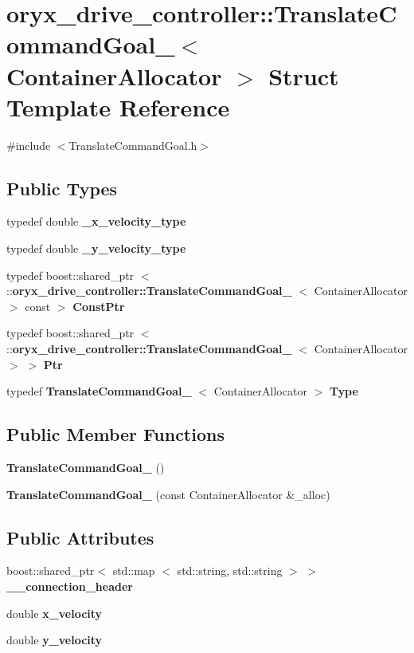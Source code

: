 \section{oryx\-\_\-drive\-\_\-controller\-:\-:\-Translate\-Command\-Goal\-\_\-$<$ \-Container\-Allocator $>$ \-Struct \-Template \-Reference}
\label{structoryx__drive__controller_1_1TranslateCommandGoal__}


{\ttfamily \#include $<$\-Translate\-Command\-Goal.\-h$>$}

\subsection*{\-Public \-Types}
\begin{DoxyCompactItemize}
\item 
typedef double {\bf \-\_\-x\-\_\-velocity\-\_\-type}
\item 
typedef double {\bf \-\_\-y\-\_\-velocity\-\_\-type}
\item 
typedef boost\-::shared\-\_\-ptr\*
$<$ \-::{\bf oryx\-\_\-drive\-\_\-controller\-::\-Translate\-Command\-Goal\-\_\-}\*
$<$ \-Container\-Allocator $>$ const  $>$ {\bf \-Const\-Ptr}
\item 
typedef boost\-::shared\-\_\-ptr\*
$<$ \-::{\bf oryx\-\_\-drive\-\_\-controller\-::\-Translate\-Command\-Goal\-\_\-}\*
$<$ \-Container\-Allocator $>$ $>$ {\bf \-Ptr}
\item 
typedef {\bf \-Translate\-Command\-Goal\-\_\-}\*
$<$ \-Container\-Allocator $>$ {\bf \-Type}
\end{DoxyCompactItemize}
\subsection*{\-Public \-Member \-Functions}
\begin{DoxyCompactItemize}
\item 
{\bf \-Translate\-Command\-Goal\-\_\-} ()
\item 
{\bf \-Translate\-Command\-Goal\-\_\-} (const \-Container\-Allocator \&\-\_\-alloc)
\end{DoxyCompactItemize}
\subsection*{\-Public \-Attributes}
\begin{DoxyCompactItemize}
\item 
boost\-::shared\-\_\-ptr$<$ std\-::map\*
$<$ std\-::string, std\-::string $>$ $>$ {\bf \-\_\-\-\_\-connection\-\_\-header}
\item 
double {\bf x\-\_\-velocity}
\item 
double {\bf y\-\_\-velocity}
\end{DoxyCompactItemize}



